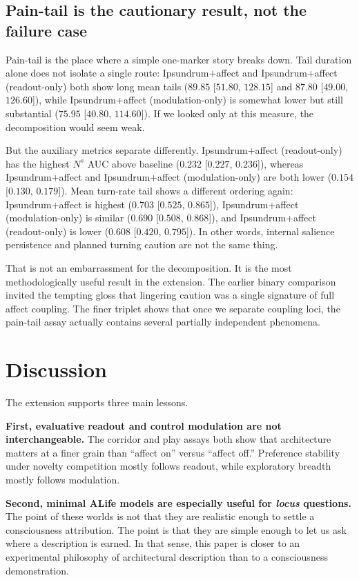\documentclass[letterpaper]{article}
\newcommand{\full}{Ipsundrum+affect}
\newcommand{\readout}{Ipsundrum+affect (readout-only)}
\newcommand{\modulation}{Ipsundrum+affect (modulation-only)}
\newcommand{\Ns}{\ensuremath{N^s}}
\begin{document}
\subsection{Pain-tail is the cautionary result, not the failure case}
Pain-tail is the place where a simple one-marker story breaks down. Tail duration alone does not isolate a single route: \full{} and \readout{} both show long mean tails ($89.85$ [$51.80$, $128.15$] and $87.80$ [$49.00$, $126.60$]), while \modulation{} is somewhat lower but still substantial ($75.95$ [$40.80$, $114.60$]). If we looked only at this measure, the decomposition would seem weak.

But the auxiliary metrics separate differently. \readout{} has the highest \Ns{} AUC above baseline ($0.232$ [$0.227$, $0.236$]), whereas \full{} and \modulation{} are both lower ($0.154$ [$0.130$, $0.179$]). Mean turn-rate tail shows a different ordering again: \full{} is highest ($0.703$ [$0.525$, $0.865$]), \modulation{} is similar ($0.690$ [$0.508$, $0.868$]), and \readout{} is lower ($0.608$ [$0.420$, $0.795$]). In other words, internal salience persistence and planned turning caution are not the same thing.

That is not an embarrassment for the decomposition. It is the most methodologically useful result in the extension. The earlier binary comparison invited the tempting gloss that lingering caution was a single signature of full affect coupling. The finer triplet shows that once we separate coupling loci, the pain-tail assay actually contains several partially independent phenomena.

\section{Discussion}
The extension supports three main lessons.

\textbf{First, evaluative readout and control modulation are not interchangeable.} The corridor and play assays both show that architecture matters at a finer grain than ``affect on'' versus ``affect off.'' Preference stability under novelty competition mostly follows readout, while exploratory breadth mostly follows modulation.

\textbf{Second, minimal ALife models are especially useful for \emph{locus} questions.} The point of these worlds is not that they are realistic enough to settle a consciousness attribution. The point is that they are simple enough to let us ask where a description is earned. In that sense, this paper is closer to an experimental philosophy of architectural description than to a consciousness demonstration.
\end{document}

